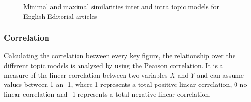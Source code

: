 \begin{figure}
	\begin{minipage}[t]{0.5\textwidth}
	\end{minipage}
	\begin{minipage}[t]{0.5\textwidth}
	\end{minipage}
	\caption{Minimal and maximal similarities inter and intra topic models for English Editorial articles}
	\label{min_max_sim_eng}
\end{figure}




\subsubsection{Correlation}
Calculating the correlation between every key figure, the relationship over the different topic models is analyzed by using the Pearson correlation. It is a measure of the linear correlation between two variables $X$ and $Y$ and can assume values between 1 an -1, where 1 represents a total positive linear correlation, 0 no linear correlation and -1 represents a total negative linear correlation. 

